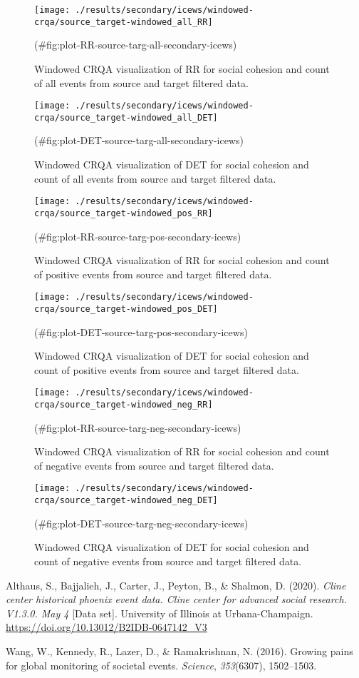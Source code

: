 \begin{appendix}
\begin{figure}
\texttt{[image: ./results/secondary/icews/windowed-crqa/source\_target-windowed\_all\_RR]} \caption{Windowed CRQA visualization of RR for social cohesion and count of all events from source and target filtered data.}(\#fig:plot-RR-source-targ-all-secondary-icews)
\end{figure}

\begin{figure}
\texttt{[image: ./results/secondary/icews/windowed-crqa/source\_target-windowed\_all\_DET]} \caption{Windowed CRQA visualization of DET for social cohesion and count of all events from source and target filtered data.}(\#fig:plot-DET-source-targ-all-secondary-icews)
\end{figure}

\begin{figure}
\texttt{[image: ./results/secondary/icews/windowed-crqa/source\_target-windowed\_pos\_RR]} \caption{Windowed CRQA visualization of RR for social cohesion and count of positive events from source and target filtered data.}(\#fig:plot-RR-source-targ-pos-secondary-icews)
\end{figure}

\begin{figure}
\texttt{[image: ./results/secondary/icews/windowed-crqa/source\_target-windowed\_pos\_DET]} \caption{Windowed CRQA visualization of DET for social cohesion and count of positive events from source and target filtered data.}(\#fig:plot-DET-source-targ-pos-secondary-icews)
\end{figure}

\begin{figure}
\texttt{[image: ./results/secondary/icews/windowed-crqa/source\_target-windowed\_neg\_RR]} \caption{Windowed CRQA visualization of RR for social cohesion and count of negative events from source and target filtered data.}(\#fig:plot-RR-source-targ-neg-secondary-icews)
\end{figure}

\begin{figure}
\texttt{[image: ./results/secondary/icews/windowed-crqa/source\_target-windowed\_neg\_DET]} \caption{Windowed CRQA visualization of DET for social cohesion and count of negative events from source and target filtered data.}(\#fig:plot-DET-source-targ-neg-secondary-icews)
\end{figure}

\hypertarget{refs}{}
\leavevmode\hypertarget{ref-illinoisdatabankIDB-2796521}{}%
Althaus, S., Bajjalieh, J., Carter, J., Peyton, B., \& Shalmon, D.
(2020). \emph{Cline center historical phoenix event data. Cline center
for advanced social research. V1.3.0. May 4} {[}Data set{]}. University
of Illinois at Urbana-Champaign.
\url{https://doi.org/10.13012/B2IDB-0647142_V3}

\leavevmode\hypertarget{ref-wang2016growing}{}%
Wang, W., Kennedy, R., Lazer, D., \& Ramakrishnan, N. (2016). Growing
pains for global monitoring of societal events. \emph{Science},
\emph{353}(6307), 1502--1503.
\end{appendix}
